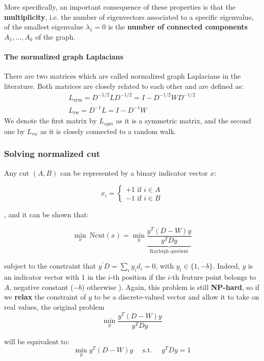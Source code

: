 More specifically, an important consequence of these properties is that the \textbf{multiplicity}, i.e. the number of eigenvectors associated to a specific eigenvalue, of the smallest eigenvalue $\lambda_1=0$ is the \textbf{number of connected components} $A_1, \dots, A_k$ of the graph. 

\paragraph{The normalized graph Laplacians} There are two matrices which are called normalized graph Laplacians in the literature. Both matrices are closely related to each other and are defined as:
$$\begin{array} { l } { L _ { \mathrm { sym } } = D ^ { - 1 / 2 } L D ^ { - 1 / 2 } = I - D ^ { - 1 / 2 } W D ^ { - 1 / 2 } } \\ { L _ { \mathrm { rw } } = D ^ { - 1 } L = I - D ^ { - 1 } W } \end{array}$$
We denote the first matrix by $L_{sym}$ as it is a symmetric matrix, and the second one by $L_{rw}$ as it is closely connected to a random walk.

\subsubsection{Solving normalized cut}
Any cut $(A,B)$ can be represented by a binary indicator vector $x$:

$$
x_i = \begin{cases}
+1 \text{  if } i \in A\\
-1 \text{  if } i \in B
\end{cases}
$$

, and it can be shown that:

$$
\min_x ~ \text{Ncut}(x) = \min_y \underbrace{\frac{y^T(D-W)y}{y^TDy}}_{\text{Rayleigh quotient}}
$$

subject to the constraint that $y ^ { \prime } D = \sum_{i} y_{i} d _ { i } = 0$, with $y _ { i } \in \{ 1 , - b \}$. Indeed, $y$ is an indicator vector with 1 in the $i$-th position if the $i$-th feature point belongs to $A$, negative constant ($-b$) otherwise ). Again, this problem is still \textbf{NP-hard}, so if we \textbf{relax} the constraint of $y$ to be a discrete-valued vector and allow it to take on real values, the original problem
$$
\min _ { y } \frac { y ^ T ( D - W ) y } { y ^ T D y }
$$

will be equivalent to:
$$
\min _ { y }  y ^ T ( D - W ) y \quad \text { s.t. } \quad y ^ T D y = 1
$$

